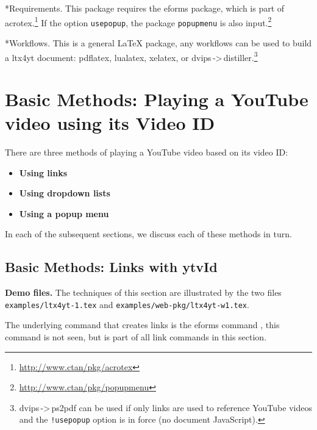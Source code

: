 \documentclass{article}
\makeatletter
\let\tops\texorpdfstring
\let\pkg\textsf
\let\app\textsf
\let\opt\texttt
\renewcommand*{\theparagraph}{\texorpdfstring{\protect\P\protect\ }{\textparagraph}}
\renewcommand{\paragraph}
    {\renewcommand{\@seccntformat}[1]{\theparagraph}%
    \@startsection{paragraph}{4}{0pt}{6pt}{-3pt}{\bfseries}} %
\newcommand{\YT}{\textsf{YouTube}}
\makeatother
\begin{document}
\paragraph*{Requirements.}
This package requires the \pkg{eforms} package, which is part of \pkg{acrotex}.\footnote{\url{http://www.ctan/pkg/acrotex}}
If the option \opt{usepopup}, the package \opt{popupmenu} is also input.\footnote{\url{http://www.ctan/pkg/popupmenu}}

\paragraph*{Workflows.} This is a general {\LaTeX} package, any workflows can be used to build
a \pkg{ltx4yt} document: \app{pdflatex}, \app{lualatex}, \app{xelatex}, or
\app{dvips\,->\,distiller}.\footnote {\app{dvips\,->\,ps2pdf} can be used if
only links are used to reference {\YT} videos and the \opt{!usepopup} option
is in force (no document JavaScript).}

\section{Basic Methods: Playing a {\YT} video using its Video ID}

There are three methods of playing a {\YT} video based on its video ID:
\begin{itemize}
    \item \textbf{Using links}
    \item \textbf{Using dropdown lists}
    \item \textbf{Using a popup menu}
\end{itemize}
In each of the subsequent sections, we discuss each of these methods in turn.

\subsection{Basic Methods: Links with \tops{\protect\cs}{\textbackslash}{ytvId}}

\textbf{Demo files.} The techniques of this section are illustrated by the two files
\texttt{examples/\allowbreak ltx4yt-1.tex} and \texttt{examples/web-pkg/ltx4yt-w1.tex}.

\newtopic\noindent
The underlying command that creates links is the \pkg{eforms} command ,
this command is not seen, but is part of all link commands in this section.
\end{document}

